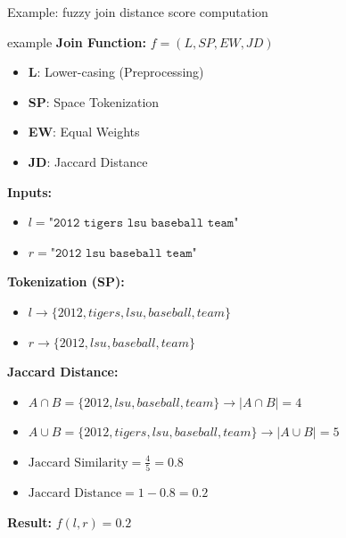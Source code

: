 \documentclass[8pt]{beamer} %
\begin{document}
\begin{frame}{Example: fuzzy join distance score computation}
	
	\tiny
	\begin{beamercolorbox}[rounded=true, shadow=true, leftskip=1em, rightskip=1em]{example}
		\textbf{Join Function:} $f = (L, SP, EW, JD)$
		\begin{itemize}
			\item \textbf{L}: Lower-casing (Preprocessing)
			\item \textbf{SP}: Space Tokenization
			\item \textbf{EW}: Equal Weights
			\item \textbf{JD}: Jaccard Distance
		\end{itemize}
		
		\vspace{1em}
		\textbf{Inputs:}
		\begin{itemize}
			\item $l = \texttt{"2012 tigers lsu baseball team"}$
			\item $r = \texttt{"2012 lsu baseball team"}$
		\end{itemize}
		
		\vspace{1em}
		\textbf{Tokenization (SP):}
		\begin{itemize}
			\item $l \rightarrow \{2012, tigers, lsu, baseball, team\}$
			\item $r \rightarrow \{2012, lsu, baseball, team\}$
		\end{itemize}
		
		\vspace{1em}
		\textbf{Jaccard Distance:}
		\begin{itemize}
			\item $A \cap B = \{2012, lsu, baseball, team\} \rightarrow |A \cap B| = 4$
			\item $A \cup B = \{2012, tigers, lsu, baseball, team\} \rightarrow |A \cup B| = 5$
			\item $\text{Jaccard Similarity} = \frac{4}{5} = 0.8$
			\item $\text{Jaccard Distance} = 1 - 0.8 = 0.2$
		\end{itemize}
		
		\vspace{1em}
		\textbf{Result:} $f(l, r) = 0.2$
	\end{beamercolorbox}
\end{frame}
\end{document}
